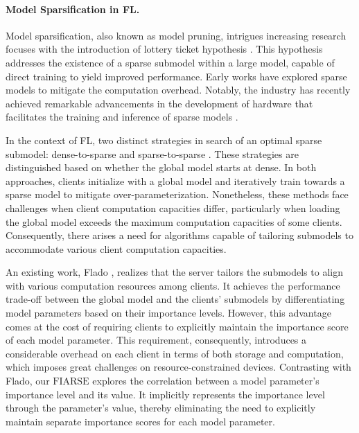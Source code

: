 \documentclass{article}
\renewcommand{\cite}{\citep}
\theoremstyle{plain}
\theoremstyle{definition}
\theoremstyle{remark}
\newcommand{\algo}{\ensuremath{\text{FIARSE}}\xspace}
\begin{document}
\paragraph{Model Sparsification in FL.} 
Model sparsification, also known as model pruning, intrigues increasing research focuses with the introduction of lottery ticket hypothesis \cite{frankle2018lottery}. This hypothesis addresses the existence of a sparse submodel within a large model, capable of direct training to yield improved performance. Early works \cite{liu2015sparse, chen2018escoin, zhu2020taming} have explored sparse models to mitigate the computation overhead. Notably, the industry has recently achieved remarkable advancements in the development of hardware that facilitates the training and inference of sparse models \cite{kurtz2020inducing, hoefler2021sparsity, iofinova2022well, kurtic2023sparse}. 

In the context of FL, two distinct strategies in search of an optimal sparse submodel: dense-to-sparse \cite{li2021fedmask, jiang2022model, isik2022sparse} and sparse-to-sparse \cite{mugunthan2022fedltn, seo2021communication, li2020lotteryfl, bibikar2022federated, dai2022dispfl}. These strategies are distinguished based on whether the global model starts at dense. In both approaches, clients initialize with a global model and iteratively train towards a sparse model to mitigate over-parameterization. Nonetheless, these methods face challenges when client computation capacities differ, particularly when loading the global model exceeds the maximum computation capacities of some clients. Consequently, there arises a need for algorithms capable of tailoring submodels to accommodate various client computation capacities. 

An existing work, Flado \cite{liao2023adaptive}, realizes that the server tailors the submodels to align with various computation resources among clients. It achieves the performance trade-off between the global model and the clients' submodels by differentiating model parameters based on their importance levels. However, this advantage comes at the cost of requiring clients to explicitly maintain the importance score of each model parameter. This requirement, consequently, introduces a considerable overhead on each client in terms of both storage and computation, which imposes great challenges on resource-constrained devices. Contrasting with Flado, our \algo explores the correlation between a model parameter's importance level and its value. It implicitly represents the importance level through the parameter's value, thereby eliminating the need to explicitly maintain separate importance scores for each model parameter. 
\end{document}
